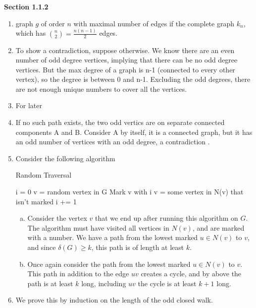 \documentclass[11pt]{article}
\begin{document}
{\bfseries Section 1.1.2}

\begin{enumerate}[1.]
    \item %
        graph $g$ of order $n$ with maximal number of edges if the complete graph
        $k_n$, which has $\binom{n}{2} = \frac{n(n-1)}{2}$ edges.
    \item %
        To show a contradiction, suppose otherwise. We know there are an even 
        number of odd degree vertices, implying that there can be no odd 
        degree vertices. But the max degree of a graph is n-1 (connected to 
        every other vertex), so the degree is between 0 and n-1. Excluding 
        the odd degrees, there are not enough unique numbers to cover all the
        vertices.
    \item %
        For later
    \item %
        If no such path exists, the two odd vertics are on separate connected 
        components A and B. Consider A by itself, it is a connected graph, 
        but it has an odd number of vertices with an odd degree, a contradiction
        . 
    \item %
        Consider the following algorithm
        \begin{algorithm}
            \caption{Random Traversal}
        \begin{algorithmic}[1]
        \State i = 0
        \State v = random vertex in G
        \Repeat
        \State Mark v with i
        \State v = some vertex in N(v) that isn't marked
        \State i += 1
        \end{algorithmic}
        \end{algorithm}
        \begin{enumerate}[a)]
            \item Consider the vertex $v$ that we end up after running this 
                algorithm on $G$. The algorithm must have visited all vertices in
                $N(v)$, and are marked with a number. We have a path from the 
                lowest marked $u \in N(v)$ to $v$, and since $\delta(G) \geq k$, 
                this path is of length at least $k$. 
            \item 
                Once again consider the path from the lowest marked $u
                \in N(v)$ to $v$. This path in addition to the edge $uv$ 
                creates a cycle, and by above the path is at least $k$ long, 
                including $uv$ the cycle is at least $k+1$ long.
        \end{enumerate}
    \item %
        We prove this by induction on the length of the odd closed walk. 


\end{enumerate}
\end{document}
